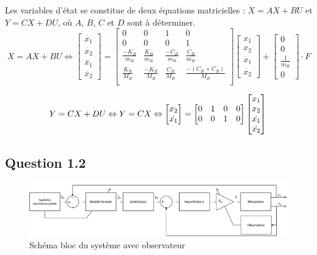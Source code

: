 \documentclass[a4paper,11pt]{article}
\begin{document}
Les variables d'état se constitue de deux équations matricielles : $\dot{X}=AX+BU$ et $Y=CX+DU$, où $A$, $B$, $C$ et $D$ sont à déterminer.
\[
    \dot{X}=AX+BU
    \Leftrightarrow
    \begin{bmatrix}
        \dot{x_{1}}\\
        \dot{x_{2}}\\
        \ddot{x_{1}}\\
        \ddot{x_{2}}
    \end{bmatrix}
    =
    \begin{bmatrix}
        0 & 0 & 1 & 0\\
        0 & 0 & 0 & 1\\
        \frac{-K_{B}}{m_{R}} & \frac{K_{B}}{m_{R}} & \frac{-C_{B}}{m_{R}} & \frac{C_{B}}{m_{R}}\\
        \frac{K_{B}}{M_{R}} & \frac{-K_{B}}{M_{R}} & \frac{C_{B}}{M_{R}} & \frac{-(C_{B}+C_{R})}{M_{R}}\\
    \end{bmatrix}
    \begin{bmatrix}
        x_{1}\\
        x_{2}\\
        \dot{x_{1}}\\
        \dot{x_{2}}
    \end{bmatrix}
    +
    \begin{bmatrix}
        0\\
        0\\
        \frac{1}{m_{R}}\\
        0
    \end{bmatrix}
    \cdot F
\]

\[
    Y=CX+DU
    \Leftrightarrow
    Y=CX
    \Leftrightarrow
    \begin{bmatrix}
        x_{2}\\
        \dot{x_{1}}
    \end{bmatrix}
    =
    \begin{bmatrix}
        0 & 1 & 0 & 0\\
        0 & 0 & 1 & 0
    \end{bmatrix}
    \begin{bmatrix}
        x_{1}\\
        x_{2}\\
        \dot{x_{1}}\\
        \dot{x_{2}}
    \end{bmatrix}\\
\]


\subsection{Question 1.2}
\begin{figure}[h!]
    \centering
    \includegraphics[width=16cm]{./img/SchemaBlocAvecObs.png}
    \caption{Schéma bloc du système avec observateur\label{fig:SchemaBlocAvecObs}}
\end{figure}
\end{document}

